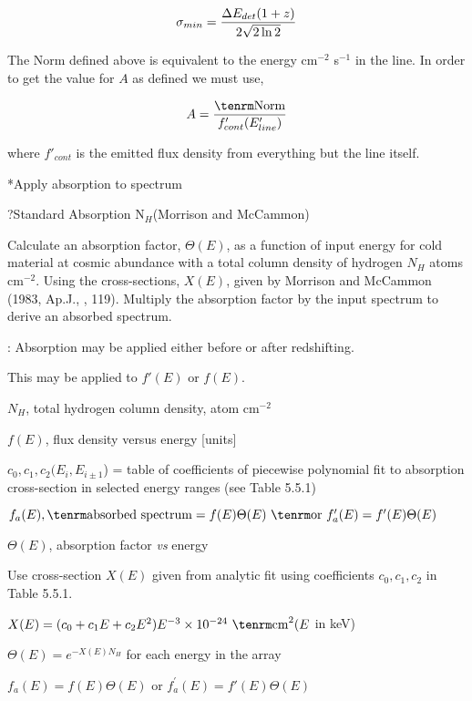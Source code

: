 $$\sigma_{min} = {\Delta E_{det} (1+z) \over {2 \sqrt{2 \ln 2}}}$$

{\listlist

The Norm defined above is equivalent to the energy cm$^{-2}$ s$^{-1}$
in the line.  In order to get the value for $A$ as defined we must
use,

}

$$A = {{\rm Norm} \over f'_{cont}(E'_{line})}$$

{\listlist

where $f'_{cont}$ is the emitted flux density from everything but the
line itself.

}

\**Apply absorption to spectrum

\??Standard Absorption N$_{H}$(Morrison and McCammon)

{\listlist


Calculate an absorption factor, $\Theta (E)$, as a function of input energy for cold
material at cosmic abundance with a total column density of hydrogen $N_H$
atoms cm$^{-2}$.  Using the cross-sections, $X(E)$, given by Morrison and McCammon
(1983, Ap.J., , 119).  Multiply the absorption factor by the input
spectrum to derive an absorbed spectrum.
 
:  Absorption may be applied either before or after redshifting.

This may be applied to $f'(E)$ or $f(E)$.


$N_H$, total hydrogen column density, atom cm$^{-2}$
 
$f(E)$, flux density versus energy [units]
 
$c_0, c_1, c_2 (E_i, E_{i\pm1}$) = table of coefficients of
piecewise polynomial fit to absorption cross-section in selected energy
ranges (see Table 5.5.1)


$f_{a}(E), {\rm absorbed~spectrum} = f(E)\Theta(E)~{\rm or}~f_{a}^{\prime}(E)
 = f^{\prime}(E)\Theta(E)$
 
$\Theta (E)$, absorption factor {\it vs} energy

 
Use cross-section $X(E)$ given from analytic fit using coefficients $c_0,
c_1, c_2$ in Table 5.5.1.
 
$X(E) = (c_0 +c_1 E+c_2 E^2) E^{-3} \times 10^{-24}~{\rm cm}^{2} (E$ in keV)

$\Theta(E) = e^{-X(E) N_H}$ for each energy in the array
 
$f_a(E) = f(E)\Theta (E)$ or $f_{a}^{\prime}(E) = f'(E)\Theta (E)$

}

